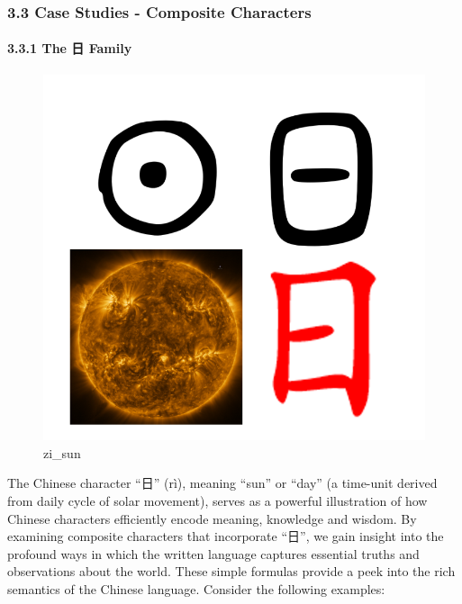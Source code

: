 \documentclass[
  11pt,
  letterpaper,
]{article}
\begin{document}
\subsubsection{3.3 Case Studies - Composite
Characters}\label{case-studies---composite-characters}

\paragraph{3.3.1 The 日 Family}\label{the-ux65e5-family}

\begin{figure}
\centering
\includegraphics{./images/zi_sun.png}
\caption{zi\_sun}
\end{figure}

The Chinese character ``日'' (rì), meaning ``sun'' or ``day'' (a
time-unit derived from daily cycle of solar movement), serves as a
powerful illustration of how Chinese characters efficiently encode
meaning, knowledge and wisdom. By examining composite characters that
incorporate ``日'', we gain insight into the profound ways in which the
written language captures essential truths and observations about the
world. These simple formulas provide a peek into the rich semantics of
the Chinese language. Consider the following examples:
\end{document}
